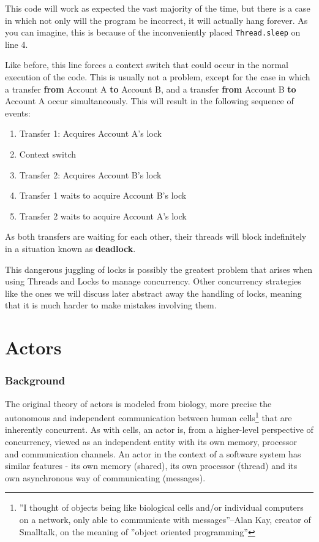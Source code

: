 \documentclass[a4paper,12pt]{kth-mag}
\begin{document}
This code will work as expected the vast majority of the time, but there is a case in which not only will the program be incorrect, it will actually hang forever. As you can imagine, this is because of the inconveniently placed \texttt{Thread.sleep} on line 4. 

Like before, this line forces a context switch that could occur in the normal execution of the code. This is usually not a problem, except for the case in which a transfer \textbf{from} Account A \textbf{to} Account B, and a transfer \textbf{from} Account B \textbf{to} Account A occur simultaneously. This will result in the following sequence of events:

\begin{enumerate}
\item Transfer 1: Acquires Account A's lock
\item Context switch
\item Transfer 2: Acquires Account B's lock
\item Transfer 1 waits to acquire Account B's lock
\item Transfer 2 waits to acquire Account A's lock
\end{enumerate}

As both transfers are waiting for each other, their threads will block indefinitely in a situation known as \textbf{deadlock}.

This dangerous juggling of locks is possibly the greatest problem that arises when using Threads and Locks to manage concurrency. Other concurrency strategies like the ones we will discuss later abstract away the handling of locks, meaning that it is much harder to make mistakes involving them.

\part{ Actors}

\section{Background}
The original theory of actors is modeled from biology, more precise the autonomous and independent communication between human cells\footnote{''I thought of objects being like biological cells and/or individual computers on a network, only able to communicate with messages''--Alan Kay, creator of Smalltalk, on the meaning of ''object oriented programming''} that are inherently concurrent. As with cells, an actor is, from a higher-level perspective of concurrency, viewed as an independent entity with its own memory, processor and communication channels. An actor in the context of a software system has similar features - its own memory (shared), its own processor (thread) and its own asynchronous way of communicating (messages).
\end{document}
